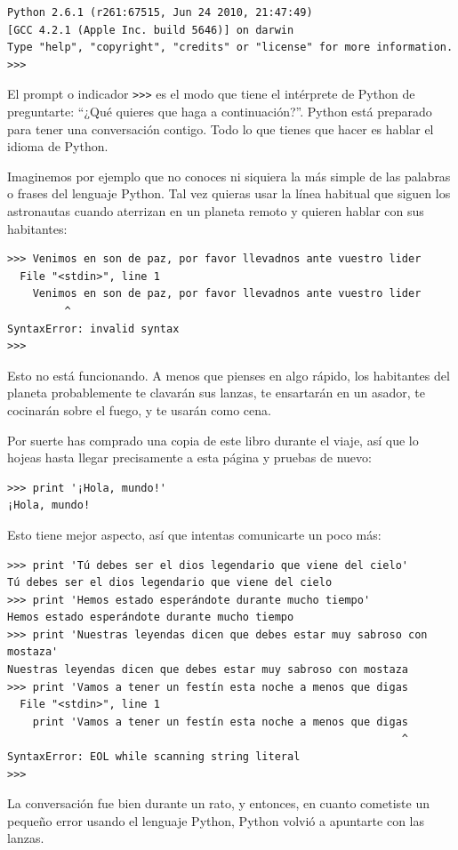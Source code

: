 
\beforeverb
\begin{verbatim}
Python 2.6.1 (r261:67515, Jun 24 2010, 21:47:49) 
[GCC 4.2.1 (Apple Inc. build 5646)] on darwin
Type "help", "copyright", "credits" or "license" for more information.
>>> 
\end{verbatim}
\afterverb
%
El prompt o indicador {\tt \verb">>>"} es el modo que tiene el intérprete de Python de preguntarte:
``¿Qué quieres que haga a continuación?''. Python está preparado para tener una conversación contigo. Todo lo que tienes que hacer es hablar el idioma de Python.

Imaginemos por ejemplo que no conoces ni siquiera la más simple de las palabras o frases del lenguaje Python. Tal vez quieras usar la línea habitual que siguen los astronautas cuando aterrizan en un planeta remoto y quieren hablar con sus habitantes:

\beforeverb
\begin{verbatim}
>>> Venimos en son de paz, por favor llevadnos ante vuestro lider
  File "<stdin>", line 1
    Venimos en son de paz, por favor llevadnos ante vuestro lider
         ^
SyntaxError: invalid syntax
>>> 
\end{verbatim}
\afterverb
%
Esto no está funcionando. A menos que pienses en algo rápido,
los habitantes del planeta probablemente te clavarán sus lanzas,
te ensartarán en un asador, te cocinarán sobre el fuego, y te usarán como cena.

Por suerte has comprado una copia de este libro durante el viaje, así que lo hojeas
hasta llegar precisamente a esta página y pruebas de nuevo:

\beforeverb
\begin{verbatim}
>>> print '¡Hola, mundo!'
¡Hola, mundo!
\end{verbatim}
\afterverb
%
Esto tiene mejor aspecto, así que intentas comunicarte un poco
más:

\beforeverb
\begin{verbatim}
>>> print 'Tú debes ser el dios legendario que viene del cielo'
Tú debes ser el dios legendario que viene del cielo
>>> print 'Hemos estado esperándote durante mucho tiempo'
Hemos estado esperándote durante mucho tiempo
>>> print 'Nuestras leyendas dicen que debes estar muy sabroso con mostaza'
Nuestras leyendas dicen que debes estar muy sabroso con mostaza
>>> print 'Vamos a tener un festín esta noche a menos que digas
  File "<stdin>", line 1
    print 'Vamos a tener un festín esta noche a menos que digas
                                                              ^
SyntaxError: EOL while scanning string literal
>>> 
\end{verbatim}
\afterverb
%
La conversación fue bien durante un rato, y entonces, en cuanto
cometiste un pequeño error usando el lenguaje Python, Python
volvió a apuntarte con las lanzas.

